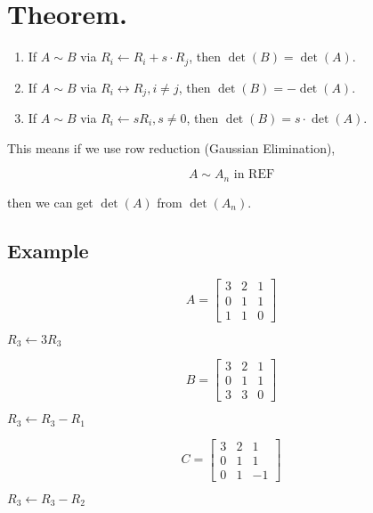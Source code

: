 \documentclass[12pt]{article}
\begin{document}
\section{Theorem.}

\begin{enumerate}[label=(\alph*)]
\item If $A \sim B$ via $R_i \gets R_i + s \cdot R_j$, then $\det(B) = \det(A)$.
\item If $A \sim B$ via $R_i \leftrightarrow R_j, i \neq j$, then $\det(B) = -\det(A)$.
\item If $A \sim B$ via $R_i \gets s R_i, s \neq 0$, then $\det(B) = s \cdot \det(A)$.
\end{enumerate}

This means if we use row reduction (Gaussian Elimination),

\[
  A \sim A_n \text{ in REF}
\]

then we can get $\det(A)$ from $\det(A_n)$.

\subsection{Example}

\begin{equation*}
  A=  \begin{bmatrix}
    3 & 2 & 1 \\
    0 & 1 & 1 \\
    1 & 1 & 0
  \end{bmatrix}
\end{equation*}

$R_3 \gets 3R_3$


\begin{equation*}
  B= \begin{bmatrix}
    3 & 2 & 1 \\
    0 & 1 & 1 \\
    3 & 3 & 0
  \end{bmatrix}
\end{equation*}

$R_3 \gets R_3 - R_1$


\begin{equation*}
  C=\begin{bmatrix}
    3 & 2 & 1 \\
    0 & 1 & 1 \\
    0 & 1 & -1
  \end{bmatrix}
\end{equation*}

$R_3 \gets R_3 - R_2$
\end{document}
